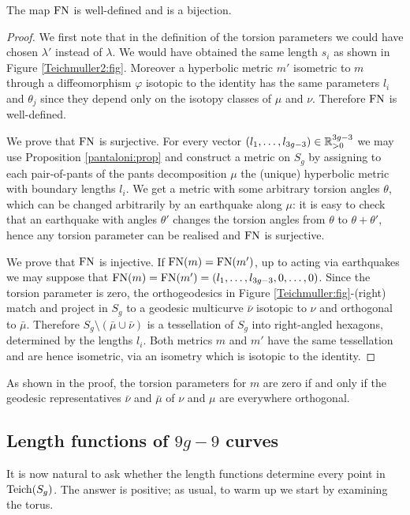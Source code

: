 \begin{teo}
The map ${\rm FN}$ is well-defined and is a bijection.
\end{teo}
\begin{proof}
We first note that in the definition of the torsion parameters we could have chosen $\lambda'$ instead of $\lambda$. We would have obtained the same length $s_i$ as shown in Figure \ref{Teichmuller2:fig}. Moreover a hyperbolic metric $m'$ isometric to $m$ through a diffeomorphism $\varphi$ isotopic to the identity has the same parameters $l_i$ and $\theta_j$ since they depend only on the isotopy classes of $\mu$ and $\nu$. Therefore ${\rm FN}$ is well-defined.

We prove that ${\rm FN}$ is surjective. For every vector $(l_1,\ldots,l_{3g-3})\in\mathbb{R}_{>0}^{3g-3}$ we may use Proposition \ref{pantaloni:prop} and construct a metric on $S_g$ by assigning to each pair-of-pants of the pants decomposition $\mu$ the (unique) hyperbolic metric with boundary lengths $l_i$. We get a metric with some arbitrary torsion angles $\theta$, which can be changed arbitrarily by an earthquake along $\mu$: it is easy to check that an earthquake with angles $\theta'$ changes the torsion angles from $\theta$ to $\theta+\theta'$, hence any torsion parameter can be realised and ${\rm FN}$ is surjective.

We prove that ${\rm FN}$ is injective. If ${\rm FN}(m) = {\rm FN}(m')$, up to acting via earthquakes we may suppose that ${\rm FN}(m)={\rm FN}(m') = (l_1,\ldots,l_{3g-3},0,\ldots,0)$. Since the torsion parameter is zero, the orthogeodesics in Figure \ref{Teichmuller:fig}-(right) match and project in $S_g$ to a geodesic multicurve $\bar \nu$ isotopic to $\nu$ and orthogonal to $\bar\mu$. Therefore $S_g\setminus (\bar\mu \cup \bar\nu)$ is a tessellation of $S_g$ into right-angled hexagons, determined by the lengths $l_i$. Both metrics $m$ and $m'$ have the same tessellation and are hence isometric, via an isometry which is isotopic to the identity.
\end{proof}

\begin{oss}
As shown in the proof, the torsion parameters for $m$ are zero if and only if the geodesic representatives $\bar \nu$ and $\bar \mu$ of $\nu$ and $\mu$ are everywhere orthogonal. 
\end{oss}


\subsection{Length functions of $9g-9$ curves}
It is now natural to ask whether the length functions determine every point in ${\rm Teich}(S_g)$. The answer is positive; as usual, to warm up we start by examining the torus.

